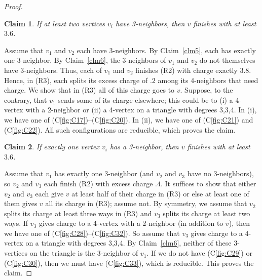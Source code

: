 \documentclass[12pt]{article}
\theoremstyle{plain}
\newtheorem{clm}{Claim}
\theoremstyle{definition}
\theoremstyle{remark}
\begin{document}
\begin{proof}
	\begin{clm}
		If at least two vertices $v_i$ have 3-neighbors, then $v$ finishes with at least
		$3.6$.
	\end{clm}
	Assume that $v_1$ and $v_2$ each have 3-neighbors.  By Claim~\ref{clm5}, each
	has exactly one 3-neighbor.  By Claim~\ref{clm6}, the 3-neighbors of $v_1$ and
	$v_2$ do not themselves have 3-neighbors.  Thus, each of $v_1$ and $v_2$
	finishes (R2) with charge exactly $3.8$.  Hence, in (R3), each splits its
	excess charge of $.2$ among its 4-neighbors that need charge.  We show that in
	(R3) all of this charge goes to $v$.  Suppose, to the contrary, that $v_1$
	sends some of its charge elsewhere; this could be to (i) a $4$-vertex with a
	2-neighbor or (ii) a 4-vertex on a triangle with degrees 3,3,4.  In (i), we
	have one of (C\ref{fig:C17})--(C\ref{fig:C20}).  In (ii), we have one of
	(C\ref{fig:C21}) and (C\ref{fig:C22}).  All such configurations are reducible,
	which proves the claim.
	
	\begin{clm}
		If exactly one vertex $v_i$ has a 3-neighbor, then $v$ finishes with at least
		$3.6$.
	\end{clm}
	Assume that $v_1$ has exactly one 3-neighbor (and $v_2$ and $v_3$ have no
	3-neighbors), so $v_2$ and $v_3$ each finish (R2) with excess charge $.4$.
	It suffices to show that either $v_2$ and $v_3$ each give $v$ at least half of
	their charge in (R3) or else at least one of them gives $v$ all its charge in
	(R3); assume not.  By symmetry, we assume that $v_2$ splits its charge at least
	three ways in (R3) and $v_3$ splits its charge at least two ways.  If $v_3$
	gives charge to a 4-vertex with a 2-neighbor (in addition to $v$), then we have
	one of (C\ref{fig:C28})--(C\ref{fig:C32}).  So assume that $v_3$ gives charge to
	a 4-vertex on a triangle with degrees 3,3,4.  By Claim~\ref{clm6}, neither of
	these 3-vertices on the triangle is the 3-neighbor of $v_1$.  If we do not have
	(C\ref{fig:C29}) or (C\ref{fig:C30}), then we must have (C\ref{fig:C33}), which
	is reducible.  This proves the claim.
\end{proof}
\end{document}
